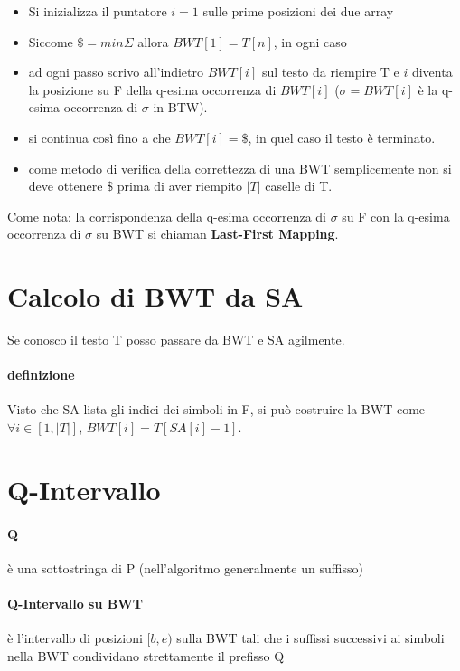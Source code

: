 \begin{itemize}
  \item Si inizializza il puntatore $i = 1$ sulle prime posizioni dei due array
  \item Siccome $\$ = min \Sigma$ allora $BWT[1] = T[n]$, in ogni caso
  \item ad ogni passo scrivo all'indietro $BWT[i]$ sul testo da riempire T e $i$ diventa la posizione su F della q-esima occorrenza di $BWT[i]$ ($\sigma = BWT[i]$ \`e la q-esima occorrenza di $\sigma$ in BTW).
  \item si continua cos\`i fino a che $BWT[i] = \$$, in quel caso il testo \`e terminato.
  \item come metodo di verifica della correttezza di una BWT semplicemente non si deve ottenere $\$$ prima di aver riempito $|T|$ caselle di T.
\end{itemize}

Come nota: la corrispondenza della q-esima occorrenza di $\sigma$ su F con la q-esima occorrenza di $\sigma$ su BWT si chiaman \textbf{Last-First Mapping}.

\section{Calcolo di BWT da SA}

Se conosco il testo T posso passare da BWT e SA agilmente.

\paragraph{definizione} Visto che SA lista gli indici dei simboli in F, si pu\`o costruire la BWT come $\forall i \in [1, |T|]$, $BWT[i] = T[SA[i] - 1]$.

\section{Q-Intervallo}

\paragraph{Q} \`e una sottostringa di P (nell'algoritmo generalmente un suffisso)
\paragraph{Q-Intervallo su BWT} \`e l'intervallo di posizioni $[b,e)$ sulla BWT tali che i suffissi successivi ai simboli nella BWT condividano strettamente il prefisso Q
